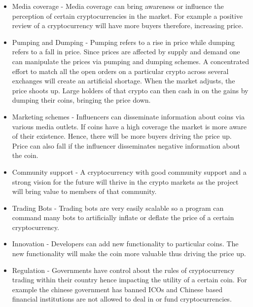 \begin{itemize}


\item Media coverage - 
Media coverage can bring awareness or influence the perception of certain cryptocurrencies in the market. For example a positive review of a cryptocurrency will have more buyers therefore, increasing price.

\item Pumping and Dumping - 
Pumping refers to a rise in price while dumping refers to a fall in price. 
Since prices are affected by supply and demand one can manipulate the prices via pumping and dumping schemes. A concentrated effort to match all the open orders on a particular crypto across several exchanges will create an artificial shortage. When the market adjusts, the price shoots up. Large holders of that crypto can then cash in on the gains by dumping their coins, bringing the price down.

\item Marketing schemes -
Influencers can disseminate information about coins via various media outlets. If coins have a high coverage the market is more aware of their existence.  Hence, there will be more buyers driving the price up.  Price can also fall if the influencer disseminates negative information about the coin.

\item Community support - 
A cryptocurrency with good community support and a strong vision for the future will thrive in the crypto markets as the project will bring value to members of that community. 

\item Trading Bots - Trading bots are very easily scalable so a program can command many bots to artificially inflate or deflate the price of a certain cryptocurrency. 

\item Innovation - Developers can add new functionality to particular coins.  The new functionality will make the coin more valuable thus driving the price up.

\item Regulation - Governments have control about the rules of cryptocurrency trading within their country  hence impacting the utility of a certain coin.  For example the chinese government has banned ICOs and Chinese based financial institutions are not allowed to deal in or fund cryptocurrencies. 
\end{itemize}

